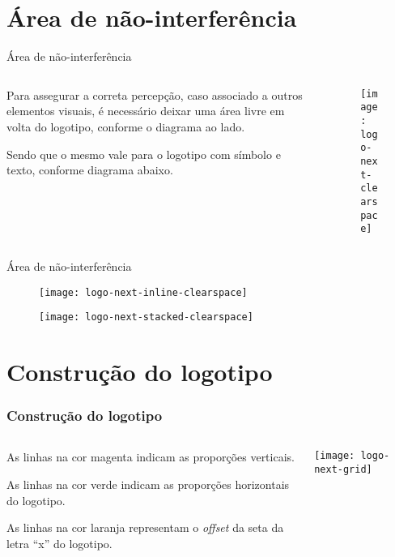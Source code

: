 \documentclass[10pt,aspectratio=43,xcolor,compress]{beamer}
\begin{document}
\section{Área de não-interferência}

\begin{frame}{Área de não-interferência}

  \begin{columns}
    \begin{column}{.35\textwidth}
      Para assegurar a correta percepção, caso associado a outros elementos
      visuais, é necessário deixar uma área livre em volta do logotipo, conforme
      o diagrama ao lado.

      Sendo que o mesmo vale para o logotipo com símbolo e texto, conforme
      diagrama abaixo.
    \end{column}
    \begin{column}{.55\textwidth}
       \begin{figure}[!htp]
         \centering
         \texttt{[image: logo-next-clearspace]}
       \end{figure}
     \end{column}
   \end{columns}
   
 \end{frame}

 \begin{frame}{Área de não-interferência}
 
\begin{figure}[!htp]
  \centering
  \texttt{[image: logo-next-inline-clearspace]}
\end{figure}

\begin{figure}[!htp]
  \centering
  \texttt{[image: logo-next-stacked-clearspace]}
\end{figure}

\end{frame}
% 

\section{Construção do logotipo}
\begin{frame}
  \frametitle{Construção do logotipo}

  \begin{columns}
    \begin{column}{.35\textwidth}
      As linhas na cor {\color[named]{magenta} magenta} indicam as proporções verticais.
    
    As linhas na cor {\color{black!30!green} verde} indicam as proporções horizontais do logotipo.

    As linhas na cor {\color{orange} laranja} representam o \emph{offset} da seta da letra ``x'' do logotipo.
    \end{column}
    \begin{column}{.65\textwidth}
      \centering
      \texttt{[image: logo-next-grid]}
     \end{column}
   \end{columns}  
\end{frame}
\end{document}
